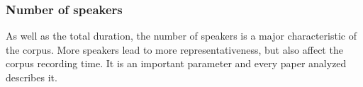 

\subsubsection{Number of speakers}

As well as the total duration, the number of speakers is a major characteristic of the corpus. More speakers lead to more representativeness, but also affect the corpus recording time. It is an important parameter and every paper analyzed describes it.
